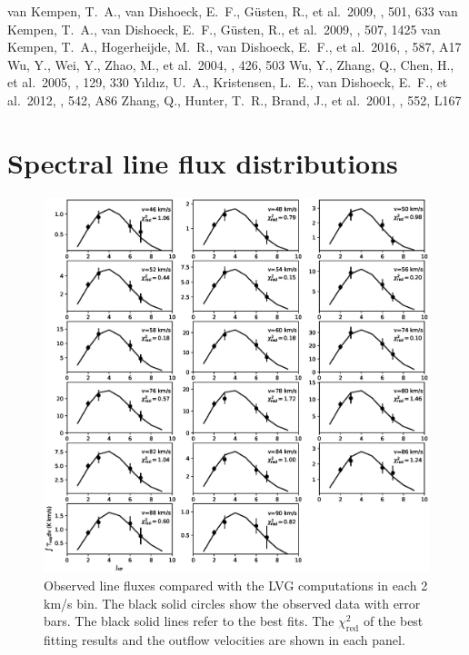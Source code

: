 \documentclass[twocolumn]{aastex62}
\begin{document}
\begin{thebibliography}{}
 van Kempen, T.~A., van Dishoeck, E.~F., G{\"u}sten, R., et al.\ 2009, \aap, 501, 633 
 van Kempen, T.~A., van Dishoeck, E.~F., G{\"u}sten, R., et al.\ 2009, \aap, 507, 1425 
 van Kempen, T.~A., Hogerheijde, M.~R., van Dishoeck, E.~F., et al.\ 2016, \aap, 587, A17
 Wu, Y., Wei, Y., Zhao, M., et al.\ 2004, \aap, 426, 503
 Wu, Y., Zhang, Q., Chen, H., et al.\ 2005, \aj, 129, 330 
 Y{\i}ld{\i}z, U.~A., Kristensen, L.~E., van Dishoeck, E.~F., et al.\ 2012, \aap, 542, A86
 Zhang, Q., Hunter, T.~R., Brand, J., et al.\ 2001, \apjl, 552, L167 
\end{thebibliography}

\appendix
\section{Spectral line flux distributions}
\begin{figure}[htbp]
\addtocounter{figure}{1}
\includegraphics[scale=.60]{./fig/SED.eps}
\caption{Observed line fluxes compared with the LVG computations in each 2 km/s bin. The black solid circles show the observed data with error bars. The black solid lines refer to the best fits.  The $\chi^2_{\mathrm{red}}$ of the best fitting results and the outflow velocities are shown in each panel. \label{fig:figsed}}
\end{figure}
\end{document}
